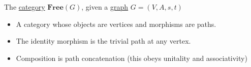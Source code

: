 The \href{doc/1 math/Seven Sketches in Compositionality/Chapter 3: Databases/2 Categories/1 Free Categories/1 Category}{category} $\mathbf{Free}(G)$, given a \href{doc/1 math/Seven Sketches in Compositionality/Chapter 1: Generative Effects/3 Preorders/Graph}{graph} $G=(V,A,s,t)$

\begin{itemize}
    \item  A category whose objects are vertices and morphisms are paths.
    \item The identity morphism is the trivial path at any vertex.
    \item Composition is path concatenation (this obeys unitality and associativity)
  \end{itemize}
